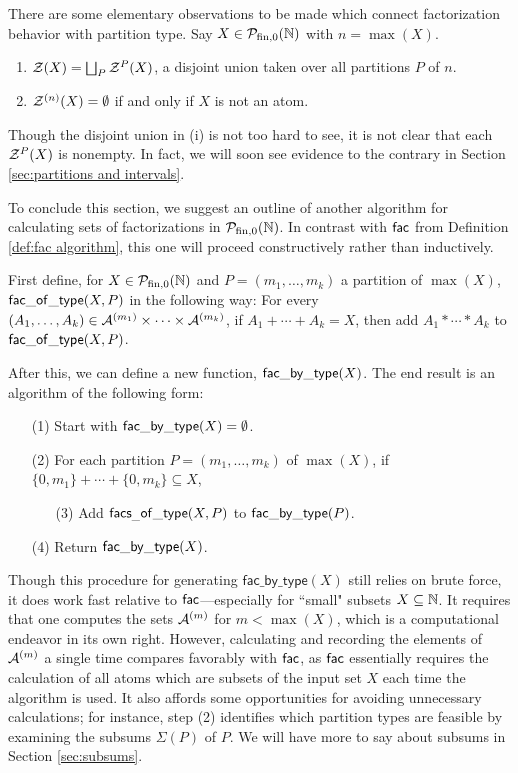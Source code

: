\begin{rk} \label{rk:ptype}
	There are some elementary observations to be made which connect factorization behavior with partition type.
	Say $X \in {\mathcal{P}_{\textrm{fin},0}(\mathbb{N})}$ with $n = \max(X)$.
	\begin{enumerate}[label={\rm (\roman{*})}]
		\item $\mathcal{Z}(X) = \bigsqcup_{P} \mathcal{Z}^P(X)$, a disjoint union taken over all partitions $P$ of $n$.
		\item $\mathcal{Z}^{(n)}(X) = \emptyset$ if and only if $X$ is not an atom.
	\end{enumerate}
	Though the disjoint union in (i) is not too hard to see, it is not clear that each $\mathcal{Z}^P(X)$ is nonempty.
	In fact, we will soon see evidence to the contrary in Section \ref{sec:partitions and intervals}.
\end{rk}


To conclude this section, we suggest an outline of another algorithm for calculating sets of factorizations in ${\mathcal{P}_{\textrm{fin},0}(\mathbb{N})}$.
In contrast with $\mathsf{fac}$ from Definition \ref{def:fac algorithm}, this one will proceed constructively rather than inductively.

First define, for $X\in {\mathcal{P}_{\textrm{fin},0}(\mathbb{N})}$ and $P = (m_1,\dots,m_k)$ a partition of $\max(X)$, $\mathsf{fac\_of\_type}(X,P)$ in the following way:
For every $(A_1,\dots,A_k)\in \mathcal{A}^{(m_1)}\times\cdots\times\mathcal{A}^{(m_k)}$, if $A_1 + \cdots + A_k = X$, then add $A_1 * \cdots * A_k$ to $\mathsf{fac\_of\_type}(X,P)$.

After this, we can define a new function, $\mathsf{fac\_by\_type}(X)$.
The end result is an algorithm of the following form:
\begin{itemize}
	\item[(1)] Start with $\mathsf{fac\_by\_type}(X) = \emptyset$.
	\item[(2)] For each partition $P=(m_1,\dots, m_k)$ of $\max(X)$, if $\{0,m_1\}+\cdots+\{0,m_k\} \subseteq X$,
	\begin{itemize}
		\item[(3)] Add $\mathsf{facs_\_of\_type}(X,P)$ to $\mathsf{fac\_by\_type}(P)$.
	\end{itemize}
	\item[(4)] Return $\mathsf{fac\_by\_type}(X)$.
\end{itemize}

Though this procedure for generating $\mathsf{fac\_by\_type}(X)$ still relies on brute force, it does work fast relative to $\mathsf{fac}$---especially for ``small" subsets $X\subseteq \mathbb{N}$.
It requires that one computes the sets $\mathcal{A}^{(m)}$ for $m<\max(X)$, which is a computational endeavor in its own right.
However, calculating and recording the elements of $\mathcal{A}^{(m)}$ a single time compares favorably with $\mathsf{fac}$, as $\mathsf{fac}$ essentially requires the calculation of all atoms which are subsets of the input set $X$ each time the algorithm is used.
It also affords some opportunities for avoiding unnecessary calculations; for instance, step (2) identifies which partition types are feasible by examining the subsums $\Sigma(P)$ of $P$.
We will have more to say about subsums in Section \ref{sec:subsums}.




